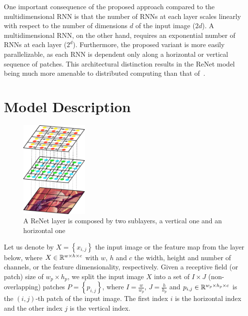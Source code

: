 One important consequence of the proposed approach compared to the
multidimensional RNN is that the number of RNNs at each layer scales linearly
with respect to the number of dimensions $d$ of the input image ($2d$). A
multidimensional RNN, on the other hand, requires an exponential number of RNNs
at each layer ($2^d$). Furthermore, the proposed variant is more easily
parallelizable, as each RNN is dependent only along a horizontal or vertical
sequence of patches. This architectural distinction results in the ReNet model
being much more amenable to distributed computing than that
of~\citet{Graves+Schmidhuber-2009}.


\section{Model Description}\label{sec:renet_model}

\begin{figure}[t]
    \centering
    \includegraphics[width=0.3\textwidth]{img/renet/renet_first_layer.pdf}
    \caption{A ReNet layer is composed by two sublayers, a vertical one and an
        horizontal one}
    \label{fig:renet_layer}
    \vspace{-3mm}
\end{figure}

Let us denote by $X=\left\{x_{i,j}\right\}$ the input image or the feature map
from the layer below, where $X \in \mathbb{R}^{w \times h \times c}$ with $w$, $h$ and
$c$ the width, height and number of channels, or the feature dimensionality,
respectively. Given a receptive field (or patch) size of $w_p \times h_p$, we
split the input image $X$ into a set of $I \times J$ (non-overlapping) patches
$P = \left\{ p_{i,j} \right\}$, where $I = \frac{w}{w_p}$, $J = \frac{h}{h_p}$
and $p_{i,j} \in \mathbb{R}^{w_p \times h_p \times c}$ is the $(i,j)$-th patch of the
input image. The first index $i$ is the horizontal index and the other index
$j$ is the vertical index.

